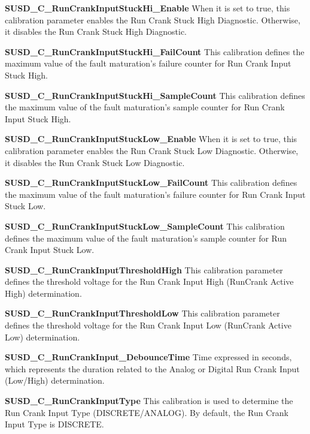 {\textbf{SUSD\_C\_RunCrankInputStuckHi\_Enable}\newline
When it is set to true, this calibration parameter enables the Run Crank Stuck High Diagnostic. Otherwise, it disables the Run Crank Stuck High Diagnostic.

\textbf{SUSD\_C\_RunCrankInputStuckHi\_FailCount}\newline
This calibration defines the maximum value of the fault maturation's failure counter for Run Crank Input Stuck High.

\textbf{SUSD\_C\_RunCrankInputStuckHi\_SampleCount}\newline
This calibration defines the maximum value of the fault maturation's sample counter for Run Crank Input Stuck High.

\textbf{SUSD\_C\_RunCrankInputStuckLow\_Enable}\newline
When it is set to true, this calibration parameter enables the Run Crank Stuck Low Diagnostic. Otherwise, it disables the Run Crank Stuck Low Diagnostic.

\textbf{SUSD\_C\_RunCrankInputStuckLow\_FailCount }\newline
This calibration defines the maximum value of the fault maturation's failure counter for Run Crank Input Stuck Low.

\textbf{SUSD\_C\_RunCrankInputStuckLow\_SampleCount }\newline
This calibration defines the maximum value of the fault maturation's sample counter for Run Crank Input Stuck Low. 

\textbf{SUSD\_C\_RunCrankInputThresholdHigh }\newline
This calibration parameter defines the threshold voltage for the Run Crank Input High (RunCrank Active High) determination.

\textbf{SUSD\_C\_RunCrankInputThresholdLow  }\newline
This calibration parameter defines the threshold voltage for the Run Crank Input Low (RunCrank Active Low) determination.

\textbf{SUSD\_C\_RunCrankInput\_DebounceTime  }\newline
Time expressed in seconds, which represents the duration related to the Analog or Digital Run Crank Input (Low/High) determination.

\textbf{SUSD\_C\_RunCrankInputType    }\newline
This calibration is used to determine the Run Crank Input Type (DISCRETE/ANALOG). By default, the Run Crank Input Type is DISCRETE.

}
